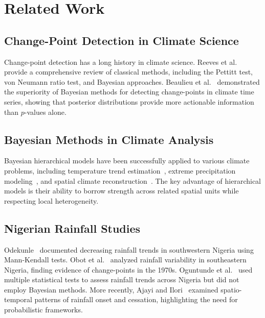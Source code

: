 \documentclass[conference]{IEEEtran}
\begin{document}
\section{Related Work}

\subsection{Change-Point Detection in Climate Science}

Change-point detection has a long history in climate science. Reeves et al.~\cite{reeves2007review} provide a comprehensive review of classical methods, including the Pettitt test, von Neumann ratio test, and Bayesian approaches. Beaulieu et al.~\cite{beaulieu2012change} demonstrated the superiority of Bayesian methods for detecting change-points in climate time series, showing that posterior distributions provide more actionable information than $p$-values alone.

\subsection{Bayesian Methods in Climate Analysis}

Bayesian hierarchical models have been successfully applied to various climate problems, including temperature trend estimation~\cite{berliner2000long}, extreme precipitation modeling~\cite{cooley2007bayesian}, and spatial climate reconstruction~\cite{tingley2010bayesian}. The key advantage of hierarchical models is their ability to borrow strength across related spatial units while respecting local heterogeneity.

\subsection{Nigerian Rainfall Studies}

Odekunle~\cite{odekunle2006rainfall} documented decreasing rainfall trends in southwestern Nigeria using Mann-Kendall tests. Obot et al.~\cite{obot2010trends} analyzed rainfall variability in southeastern Nigeria, finding evidence of change-points in the 1970s. Oguntunde et al.~\cite{oguntunde2011assessment} used multiple statistical tests to assess rainfall trends across Nigeria but did not employ Bayesian methods. More recently, Ajayi and Ilori~\cite{ajayi2020temporal} examined spatio-temporal patterns of rainfall onset and cessation, highlighting the need for probabilistic frameworks.
\end{document}

